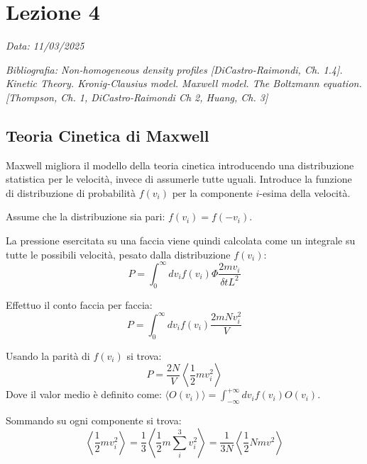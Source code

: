 \chapter{Lezione 4}
\label{chap:lezione_04} %

\begin{flushright}
\textit{Data: 11/03/2025}
\end{flushright}
\textit{Bibliografia: Non-homogeneous density profiles [DiCastro-Raimondi, Ch. 1.4]. Kinetic Theory. Kronig-Clausius model. Maxwell model. The Boltzmann equation. [Thompson, Ch. 1, DiCastro-Raimondi Ch 2, Huang, Ch. 3]}

\section{Teoria Cinetica di Maxwell}

Maxwell migliora il modello della teoria cinetica introducendo una distribuzione statistica per le velocità, invece di assumerle tutte uguali. Introduce la funzione di distribuzione di probabilità $f(v_i)$ per la componente $i$-esima della velocità.

Assume che la distribuzione sia pari: $f(v_i)=f(-v_i)$.

La pressione esercitata su una faccia viene quindi calcolata come un integrale su tutte le possibili velocità, pesato dalla distribuzione $f(v_i)$:
\begin{equation}
    P=\int_{0}^{\infty}dv_{i}f(v_{i})\Phi\frac{2mv_{i}}{\delta tL^{2}}
    \label{eq:maxwell_p_integral}
\end{equation}

Effettuo il conto faccia per faccia:
\begin{equation}
    P=\int_{0}^{\infty}dv_{i}f(v_{i})\frac{2mNv_{i}^2}{V}
    \label{eq:maxwell_p_integral_2}
\end{equation}

Usando la parità di $f(v_i)$ si trova:
\begin{equation}
    P =  \frac{2N}{V} \left< \frac{1}{2} m v_i^2 \right>
    \label{eq:maxwell_p_avg}
\end{equation}
Dove il valor medio è definito come: $\langle O(v_i) \rangle = \int_{-\infty}^{+\infty} dv_i f(v_i) O(v_i)$.

Sommando su ogni componente si trova:
\begin{equation}
    \left< \frac{1}{2} m v_i^2 \right> = \frac{1}{3} \left< \frac{1}{2} m \sum_i^3 v_i^2 \right> = \frac{1}{3N} \left< \frac{1}{2} N m v^2 \right>
    \label{eq:avg_energy_component}
\end{equation}

